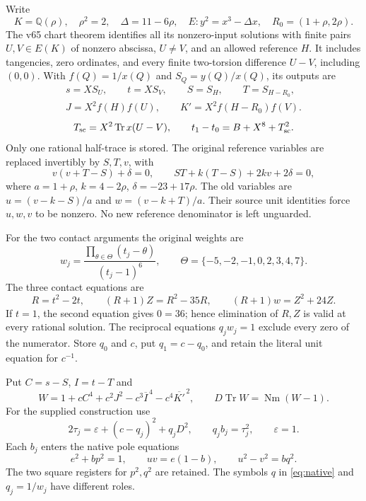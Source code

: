 \documentclass[11pt,a4paper]{article}
\newcommand{\Q}{\mathbb Q}\newcommand{\Z}{\mathbb Z}
\DeclareMathOperator{\Tr}{Tr}\DeclareMathOperator{\Nm}{Nm}
\begin{document}
Write
\[
 K=\Q(\rho),\quad \rho^2=2,\quad \Delta=11-6\rho,\quad
 E:y^2=x^3-\Delta x,\quad R_0=(1+\rho,2\rho).
\]
The v65 chart theorem identifies all its nonzero-input solutions with
finite pairs $U,V\in E(K)$ of nonzero abscissa, $U\ne V$, and an allowed
reference $H$. It includes tangencies, zero ordinates, and every finite
two-torsion difference $U-V$, including $(0,0)$.
With $f(Q)=1/x(Q)$ and $S_Q=y(Q)/x(Q)$, its outputs are
\[
\begin{gathered}
s=XS_U,\qquad t=XS_V,\qquad S=S_H,\qquad T=S_{H-R_0},\\
J=X^2f(H)f(U),\qquad K'=X^2f(H-R_0)f(V).
\end{gathered}
\]
\[
 T_{\rm sc}=X^2\Tr x(U-V),\qquad
 t_1-t_0=B+X^8+T_{\rm sc}^2.
\]
Only one rational half-trace is stored. The original reference variables
are replaced invertibly by $S,T,v$, with
\[
 v(v+T-S)+\delta=0,\qquad ST+k(T-S)+2kv+2\delta=0,
\]
where $a=1+\rho$, $k=4-2\rho$, $\delta=-23+17\rho$.
The old variables are $u=(v-k-S)/a$ and $w=(v-k+T)/a$.
Their source unit identities force $u,w,v$ to be nonzero. No new
reference denominator is left unguarded.

For the two contact arguments the original weights are
\[
 w_j=\frac{\prod_{\theta\in\Theta}(t_j-\theta)}{(t_j-1)^6},\qquad
 \Theta=\{-5,-2,-1,0,2,3,4,7\}.
\]
The three contact equations are
\[
 R=t^2-2t,\qquad(R+1)Z=R^2-35R,\qquad(R+1)w=Z^2+24Z.
\]
If $t=1$, the second equation gives $0=36$; hence elimination of
$R,Z$ is valid at every rational solution. The reciprocal equations
$q_jw_j=1$ exclude every zero of the numerator. Store $q_0$ and $c$,
put $q_1=c-q_0$, and retain the literal unit equation for $c^{-1}$.

Put $C=s-S$, $I=t-T$ and
\begin{equation}\label{eq:W}
 W=1+cC^4+c^2J^2-c^3\overline I^{\,4}-c^4\overline {K'}^{\,2},
 \qquad D\Tr W=\Nm(W-1).
\end{equation}
For the supplied construction use
\begin{equation}\label{eq:gate-eps}
 2\tau_j=\varepsilon+(c-q_j)^2+q_jD^2,
 \qquad q_jb_j=\tau_j^2,\qquad \varepsilon=1.
\end{equation}
Each $b_j$ enters the native pole equations
\begin{equation}\label{eq:native}
 e^2+bp^2=1,\qquad uv=e(1-b),\qquad u^2-v^2=bq^2.
\end{equation}
The two square registers for $p^2,q^2$ are retained. The symbols $q$ in
\eqref{eq:native} and $q_j=1/w_j$ have different roles.
\end{document}
